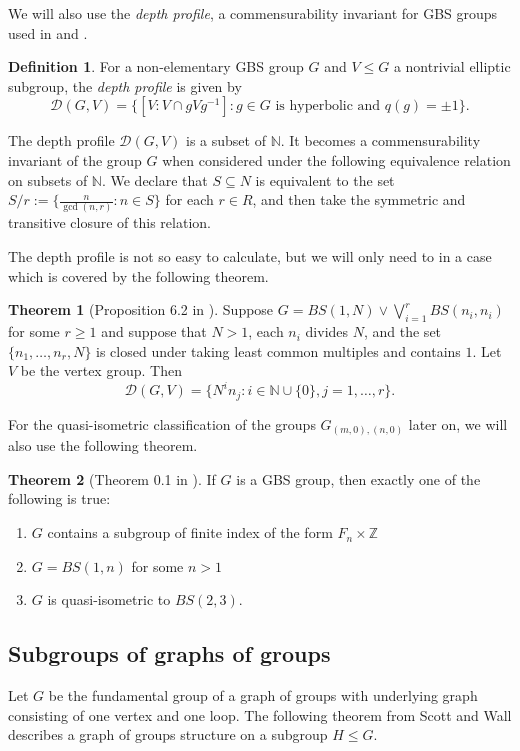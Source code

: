 \documentclass[10pt]{article}
\def\integers{{\mathbb{Z}}}
\def\naturals{{\mathbb N}}
\def\D{\mathcal{D}}
\def\subs{\subseteq}
\theoremstyle{definition}
\newtheorem{theorem}{Theorem}
\newtheorem{definition}{Definition}
\begin{document}
We will also use the \textit{depth profile}, a commensurability invariant for GBS groups used in \cite{For24} and \cite{Verma}. \begin{definition}
    For a non-elementary GBS group $G$ and $V\leq G$ a nontrivial elliptic subgroup, the \textit{depth profile} is given by $$\D(G,V) = \{[V:V\cap gVg^{-1}]: g\in G \text{ is hyperbolic and }q(g)=\pm 1\}.$$
\end{definition}
The depth profile $\D(G,V)$ is a subset of $\naturals$. It becomes a commensurability invariant of the group $G$ when considered under the following equivalence relation on subsets of $\naturals$.  We declare that $S\subs N$ is equivalent to the set $S/r:= \{\frac{n}{\gcd(n,r)}: n\in S\}$ for each $r\in R$, and then take the symmetric and transitive closure of this relation. 

The depth profile is not so easy to calculate, but we will only need to in a case which is covered by the following theorem. 

\begin{theorem}[Proposition 6.2 in \cite{For24}]\label{Prop6.2For} Suppose $G=BS(1,N) \vee \bigvee_{i=1}^r BS(n_i, n_i)$ for some $r\geq 1$ and suppose that $N>1$, each $n_i$ divides $N$, and the set $\{n_1,\dots,n_r,N\}$ is closed under taking least common multiples and contains $1$. Let $V$ be the vertex group. Then 
$$\D(G,V) = \{N^i n_j: i\in \naturals\cup \{0\}, j=1,\dots,r\}.$$
    
\end{theorem}

For the quasi-isometric classification of the groups $G_{(m,0),(n,0)}$ later on, we will also use the following theorem. 

\begin{theorem}[Theorem 0.1 in \cite{Whyte}]\label{Whyte}
If $G$ is a GBS group, then exactly one of the following is true:
\begin{enumerate}
    \item $G$ contains a subgroup of finite index of the form $F_n \times \integers$
    \item $G=BS(1,n)$ for some $n>1$
    \item $G$ is quasi-isometric to $BS(2,3)$. 
\end{enumerate}
\end{theorem}

\subsection{Subgroups of  graphs of groups}
Let $G$ be the fundamental group of a  graph of groups  with underlying graph consisting of one vertex and one loop. 
The following theorem from Scott and Wall describes a graph of groups structure on a subgroup $H \leq G$. 
\end{document}
